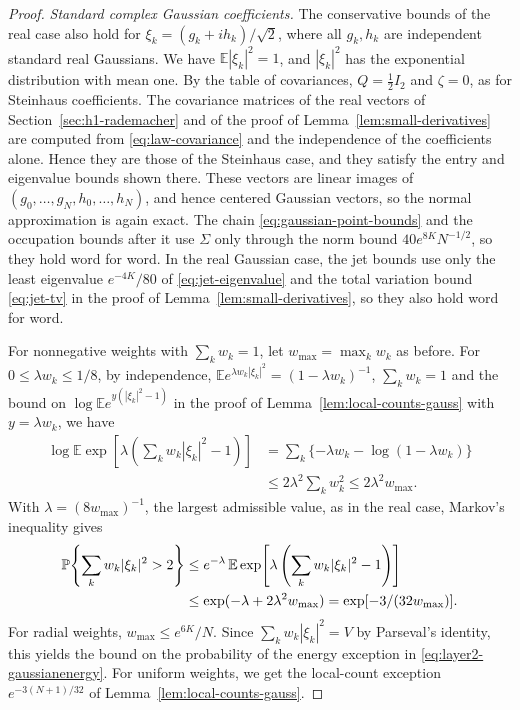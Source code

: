 \begin{proof}
\medskip
\noindent\emph{Standard complex Gaussian coefficients.}
The conservative bounds of the real case also hold for
$\xi_k=(g_k+ih_k)/\sqrt2$, where all $g_k,h_k$ are independent standard
real Gaussians.
We have $\mathbb E|\xi_k|^2=1$, and $|\xi_k|^2$ has the exponential
distribution with mean one.
By the table of covariances, $Q=\tfrac12I_2$ and $\zeta=0$, as for
Steinhaus coefficients.
The covariance matrices of the real vectors of
Section~\ref{sec:h1-rademacher} and of the proof of
Lemma~\ref{lem:small-derivatives} are computed from
\eqref{eq:law-covariance} and the independence of the coefficients
alone. Hence they are those of the Steinhaus case, and they satisfy the
entry and eigenvalue bounds shown there.
These vectors are linear images of $(g_0,\dots,g_N,h_0,\dots,h_N)$, and
hence centered Gaussian vectors, so the normal approximation is again
exact.
The chain \eqref{eq:gaussian-point-bounds} and the occupation bounds
after it use $\Sigma$ only through the norm bound $40e^{8K}N^{-1/2}$, so
they hold word for word.
In the real Gaussian case, the jet bounds use only the least eigenvalue
$e^{-4K}/80$ of \eqref{eq:jet-eigenvalue} and the total variation bound
\eqref{eq:jet-tv} in the proof of Lemma~\ref{lem:small-derivatives}, so
they also hold word for word.

For nonnegative weights with $\sum_kw_k=1$, let $w_{\max}=\max_kw_k$ as
before.
For $0\le\lambda w_k\le1/8$, by independence,
$\mathbb Ee^{\lambda w_k|\xi_k|^2}=(1-\lambda w_k)^{-1}$,
$\sum_kw_k=1$ and the bound on
$\log\mathbb Ee^{y(|\xi_k|^2-1)}$ in the proof of
Lemma~\ref{lem:local-counts-gauss} with $y=\lambda w_k$, we have
\begin{align*}
 \log\mathbb E\exp\!\left[\lambda\left(\sum_kw_k|\xi_k|^2-1\right)\right]
 &=\sum_k\{-\lambda w_k-\log(1-\lambda w_k)\}\\
 &\le2\lambda^2\sum_kw_k^2
 \le2\lambda^2w_{\max}.
\end{align*}
With $\lambda=(8w_{\max})^{-1}$, the largest admissible value, as in the
real case, Markov's inequality gives
\begin{align*}
 \mathbb P\!\left\{\sum_kw_k|\xi_k|^2>2\right\}
 &\le e^{-\lambda}\,\mathbb E\exp\!\left[\lambda\left(\sum_kw_k|\xi_k|^2-1
 \right)\right]\\
 &\le\exp(-\lambda+2\lambda^2w_{\max})
 =\exp[-3/(32w_{\max})].
\end{align*}
For radial weights, $w_{\max}\le e^{6K}/N$.
Since $\sum_kw_k|\xi_k|^2=V$ by Parseval's identity, this yields the bound
on the probability of the energy exception in
\eqref{eq:layer2-gaussianenergy}.
For uniform weights, we get the local-count exception $e^{-3(N+1)/32}$
of Lemma~\ref{lem:local-counts-gauss}.


\end{proof}
